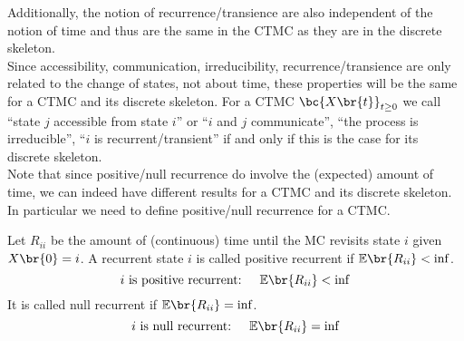 \documentclass{article}
\newcommand{\Exp}{\mathbb{E}}
\begin{document}
    Additionally, the notion of recurrence/transience are also independent of the notion of time and thus are the same in the CTMC as they are in the discrete skeleton. \\

    Since accessibility, communication, irreducibility, recurrence/transience are only related to the change of states, not about time, these properties will be the same for a CTMC and its discrete skeleton. For a CTMC $\bc{X\br{t}}_{t \geq 0}$ we call ``state $j$ accessible from state $i$'' or ``$i$ and $j$ communicate'', ``the process is irreducible'', ``$i$ is recurrent/transient'' if and only if this is the case for its discrete skeleton. \\

    Note that since positive/null recurrence do involve the (expected) amount of time, we can indeed have different results for a CTMC and its discrete skeleton. In particular we need to define positive/null recurrence for a CTMC.
    \begin{definition}
        Let $R_{ii}$ be the amount of (continuous) time until the MC revisits state $i$ given $X\br{0}= i$. A recurrent state $i$ is called positive recurrent if $\Exp\br{R_{ii}}< \inf$.
        \[\text{$i$ is positive recurrent: } \quad \Exp\br{R_{ii}}< \inf\]
        It is called null recurrent if $\Exp\br{R_{ii}} = \inf$.
        \[\text{$i$ is null recurrent: } \quad \Exp\br{R_{ii}} = \inf\]
    \end{definition}
\end{document}
